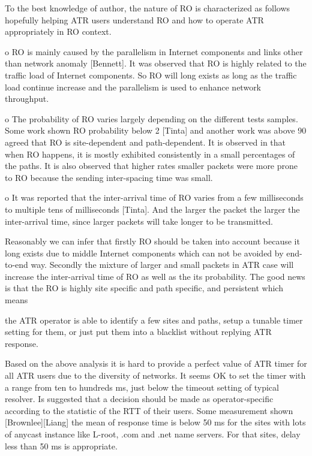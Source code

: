 To the best knowledge of author, the nature of RO is characterized as
follows hopefully helping ATR users understand RO and how to operate
ATR appropriately in RO context.

o  RO is mainly caused by the parallelism in Internet components and
   links other than network anomaly [Bennett].  It was observed that
   RO is highly related to the traffic load of Internet components.
   So RO will long exists as long as the traffic load continue
   increase and the parallelism is used to enhance network
   throughput.

o  The probability of RO varies largely depending on the different
   tests samples.  Some work shown RO probability below 2%
   [Tinta] and another work was above 90%
   agreed that RO is site-dependent and path-dependent.  It is
   observed in that when RO happens, it is mostly exhibited
   consistently in a small percentages of the paths.  It is also
   observed that higher rates smaller packets were more prone to RO
   because the sending inter-spacing time was small.

o  It was reported that the inter-arrival time of RO varies from a
   few milliseconds to multiple tens of milliseconds [Tinta].  And
   the larger the packet the larger the inter-arrival time, since
   larger packets will take longer to be transmitted.

Reasonably we can infer that firstly RO should be taken into account
because it long exists due to middle Internet components which can
not be avoided by end-to-end way.  Secondly the mixture of larger and
small packets in ATR case will increase the inter-arrival time of RO
as well as the its probability.  The good news is that the RO is
highly site specific and path specific, and persistent which means

the ATR operator is able to identify a few sites and paths, setup a
tunable timer setting for them, or just put them into a blacklist
without replying ATR response.

Based on the above analysis it is hard to provide a perfect value of
ATR timer for all ATR users due to the diversity of networks.  It
seems OK to set the timer with a range from ten to hundreds ms, just
below the timeout setting of typical resolver.  Is suggested that a
decision should be made as operator-specific according to the
statistic of the RTT of their users.  Some measurement shown
[Brownlee][Liang] the mean of response time is below 50 ms for the
sites with lots of anycast instance like L-root, .com and .net name
servers.  For that sites, delay less than 50 ms is appropriate.

